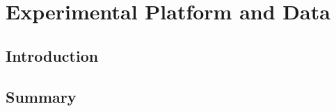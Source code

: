 %


\chapter{Experimental Platform and Data}
\label{chap:platform}


\section{Introduction}

\section{Summary}
\label{sec:platform:summary}
